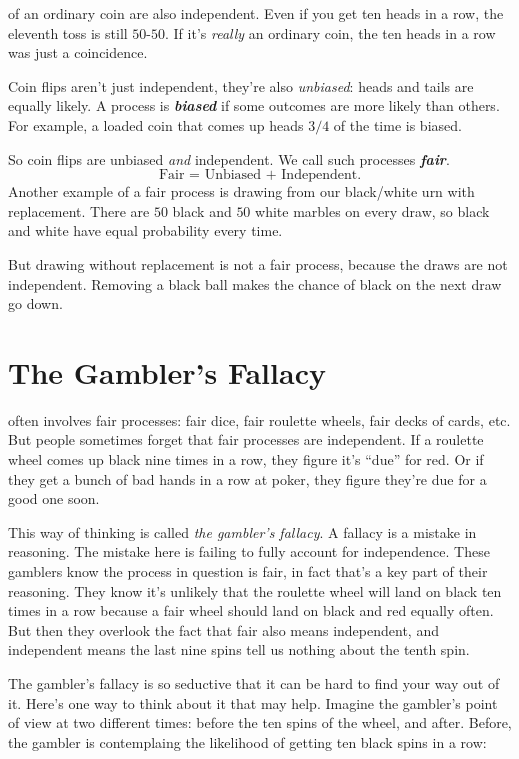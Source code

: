 \documentclass[justified]{tufte-book}
\theoremstyle{definition}
\theoremstyle{definition}
\theoremstyle{definition}
\theoremstyle{remark}
\begin{document}
 of an ordinary coin are also independent. Even if you
get ten heads in a row, the eleventh toss is still \(50\)-\(50\). If
it's \emph{really} an ordinary coin, the ten heads in a row was just a
coincidence.

Coin flips aren't just independent, they're also \emph{unbiased}: heads
and tails are equally likely. A process is \textbf{\emph{biased}} if
some outcomes are more likely than others. For example, a loaded coin
that comes up heads \(3/4\) of the time is biased.

So coin flips are unbiased \emph{and} independent. We call such
processes \textbf{\emph{fair}}.
\[ \mbox{Fair = Unbiased + Independent}.\] Another example of a fair
process is drawing from our black/white urn with replacement. There are
\(50\) black and \(50\) white marbles on every draw, so black and white
have equal probability every time.

But drawing without replacement is not a fair process, because the draws
are not independent. Removing a black ball makes the chance of black on
the next draw go down.

\hypertarget{the-gamblers-fallacy-1}{%
\section{The Gambler's Fallacy}\label{the-gamblers-fallacy-1}}

 often involves fair processes: fair dice, fair
roulette wheels, fair decks of cards, etc. But people sometimes forget
that fair processes are independent. If a roulette wheel comes up black
nine times in a row, they figure it's ``due'' for red. Or if they get a
bunch of bad hands in a row at poker, they figure they're due for a good
one soon.

This way of thinking is called \emph{the gambler's fallacy}. A fallacy
is a mistake in reasoning. The mistake here is failing to fully account
for independence. These gamblers know the process in question is fair,
in fact that's a key part of their reasoning. They know it's unlikely
that the roulette wheel will land on black ten times in a row because a
fair wheel should land on black and red equally often. But then they
overlook the fact that fair also means independent, and independent
means the last nine spins tell us nothing about the tenth spin.

The gambler's fallacy is so seductive that it can be hard to find your
way out of it. Here's one way to think about it that may help. Imagine
the gambler's point of view at two different times: before the ten spins
of the wheel, and after. Before, the gambler is contemplaing the
likelihood of getting ten black spins in a row:
\end{document}
